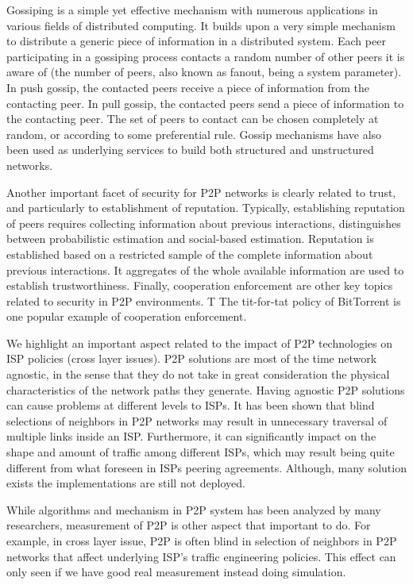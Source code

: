 Gossiping is a simple yet effective mechanism with numerous applications in various fields of distributed computing. 
It builds upon a very simple mechanism to distribute a generic piece of information in a distributed system. 
Each peer participating in a gossiping process contacts a random number of other peers it is aware of (the number of peers, also known as fanout, being a system parameter). 
In push gossip, the contacted peers receive a piece of information from the contacting peer. 
In pull gossip, the contacted peers send a piece of information to the contacting peer. 
The set of peers to contact can be chosen completely at random, or according to some preferential rule.
Gossip mechanisms have also been used as underlying services to build both structured and unstructured networks. 

Another important facet of security for P2P networks is clearly related to trust, and particularly to establishment of reputation. 
Typically, establishing reputation of peers requires collecting information about previous interactions, distinguishes between probabilistic estimation and social-based estimation. 
Reputation is established based on a restricted sample of the complete information about previous interactions. 
It aggregates of the whole available information are used to establish trustworthiness.
Finally, cooperation enforcement are other key topics related to security in P2P environments. T
The tit-for-tat policy of BitTorrent is one popular example of cooperation enforcement.

We highlight an important aspect related to the impact of P2P technologies on ISP policies (cross layer issues). 
P2P solutions are most of the time network agnostic, in the sense that they do not take in great consideration the physical characteristics of the network paths they generate. 
Having agnostic P2P solutions can cause problems at different levels to ISPs. 
It has been shown that blind selections of neighbors in P2P networks may result in unnecessary traversal of multiple links inside an ISP. 
Furthermore, it can significantly impact on the shape and amount of traffic among different ISPs, which may result being quite different from what foreseen in ISPs peering agreements.
Although, many solution exists the implementations are still not deployed. 

While algorithms and mechanism in P2P system has been analyzed by many researchers, measurement of P2P is other aspect that important to do. 
For example, in cross layer issue, P2P is often blind in selection of neighbors in P2P networks that affect underlying ISP's traffic engineering policies.  
This effect can only seen if we have good real measurement instead doing simulation.

